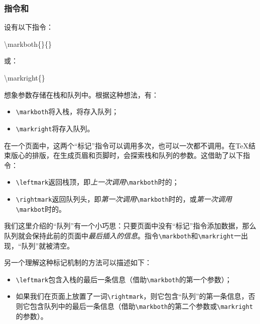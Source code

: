 \subsubsection{指令和}

设有以下指令：

\begin{dmd}
\backslash markboth\{\}\{\}
\end{dmd}

或：

\begin{dmd}
\backslash markright\{\}
\end{dmd}

想象参数存储在栈和队列中。根据这种想法，有：

\begin{itemize}
    \item \verb|\markboth|将入栈，将存入队列；
    \item \verb|\markright|将存入队列。
\end{itemize}

在一个页面中，这两个``标记''指令可以调用多次，也可以一次都不调用。在\TeX 结束版心的排版，在生成页眉和页脚时，会探索栈和队列的参数。这借助了以下指令：

\begin{itemize}
    \item \verb|\leftmark|返回栈顶，即\emph{上一次调用}\verb|\markboth|时的；
    \item \verb|\rightmark|返回队列头，即\emph{第一次调用}\verb|\markboth|时的，或\emph{第一次调用}\verb|\markbot|时的。
\end{itemize}

\begin{exclamation}
我们这里介绍的``队列''有一个小巧思：只要页面中没有``标记''指令添加数据，那么队列就会保持此前的页面中\emph{最后插入的信息}。指令\verb|\markboth|和\verb|\markright|一出现，``队列''就被清空。
\end{exclamation}

另一个理解这种标记机制的方法可以描述如下：

\begin{itemize}
    \item \verb|\leftmark|包含入栈的最后一条信息（借助\verb|\markboth|的第一个参数）；
    \item 如果我们在页面上放置了一词\verb|\rightmark|，则它包含``队列''的第一条信息，否则它包含队列中的最后一条信息（借助\verb|\markboth|的第二个参数或\verb|\markright|的参数）。
\end{itemize}

